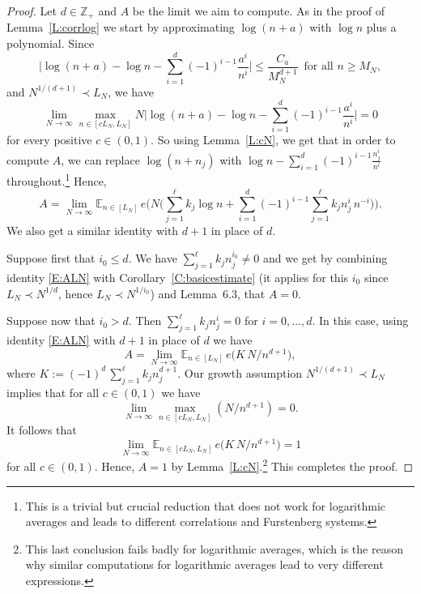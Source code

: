 \documentclass[11pt]{amsart}
\theoremstyle{definition}
\newcommand{\E}{{\mathbb E}}
\newcommand{\Z}{{\mathbb Z}}
\begin{document}
 \begin{proof}
 	Let $d\in \Z_+$ and $A$ be the limit we aim to compute. As in the proof of  	Lemma~\ref{L:corrlog}
 	 we start by approximating $\log(n+a)$ with $\log n$ plus a polynomial.  Since
 	$$
 	\Big| \log(n+a)-\log n- \sum_{i=1}^d (-1)^{i-1} \frac{a^i} {n^i}\Big|\leq \frac{C_a}{M_N^{d+1}} \, \text{ for all } n\geq  M_N,
 	$$
 	and $N^{1/(d+1)}\prec L_N$, we have
 	$$
 	\lim_{N\to\infty} \max_{n\in[cL_N,L_N]} N	\Big| \log(n+a)-\log n- \sum_{i=1}^d (-1)^{i-1} \frac{a^i} {n^i}\Big|= 0
 	$$
 	for every positive $c\in (0,1)$.
 	So using Lemma~\ref{L:cN}, we get that in order to compute $A$, we can replace $\log(n+n_j)$ with
 	$\log n- \sum_{i=1}^d (-1)^{i-1} \frac{n_j^i} {n^i}$ throughout.\footnote{This is a trivial but crucial reduction that does not work for logarithmic averages and leads to different correlations and Furstenberg systems.}  Hence,
 	\begin{equation}\label{E:ALN}
 	A=\lim_{N\to \infty} 	\E_{n\in[L_N]}\, e\big(N\big(\sum_{j=1}^\ell k_j \log n+\sum_{i=1}^d (-1)^{i-1} \sum_{j=1}^\ell k_jn_j^i \, n^{-i} \big)\big).
 	\end{equation}
 	We also get a similar identity with $d+1$ in place of $d$.
 	
 	Suppose first  that  $i_0\leq d$. We have $\sum_{j=1}^\ell k_jn_j^{i_0}\neq 0$  and we get by combining  identity \eqref{E:ALN} with  Corollary~\ref{C:basicestimate}  (it applies for this $i_0$ since $L_N\prec N^{1/d}$, hence  $L_N\prec N^{1/i_0}$) and Lemma~6.3, that $A=0$.
 	
 	Suppose now that  $i_0>d$. Then    $\sum_{j=1}^\ell k_jn_j^i= 0$ for $i=0,\ldots, d$. In this case, using identity \eqref{E:ALN} with $d+1$ in place of $d$  we have
 		$$
 	A=\lim_{N\to \infty} 	\E_{n\in[L_N]}\, e\big(  K \, N /n^{d+1}\big),
 	$$
 	where 
 	$K:=(-1)^d\, \sum_{j=1}^\ell k_jn_j^{d+1}$.
 	Our growth assumption $ N^{1/(d+1)}\prec L_N$ implies that  for all    $c\in (0,1)$ we have
 	$$
\lim_{N\to\infty} 	\max_{n\in [cL_N,L_N]} (N/n^{d+1})=0.
 	$$
 	 It follows that
 		$$
 	\lim_{N\to \infty} 	\E_{n\in[cL_N,L_N]}\, e\big( K \, N /n^{d+1}\big)=1
 	$$
 	for all  $c\in (0,1)$.  Hence, $A=1$ by Lemma~\ref{L:cN}.\footnote{This last conclusion fails badly for logarithmic averages, which is  the reason why similar computations for logarithmic averages lead to very different expressions.} This completes the proof.
 \end{proof}
\end{document}
